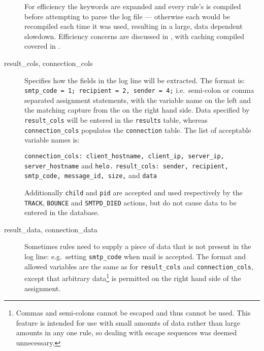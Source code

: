 \begin{description}
        For efficiency the keywords are expanded and every rule's \regex{}
        is compiled before attempting to parse the log file --- otherwise
        each \regex{} would be recompiled each time it was used, resulting
        in a large, data dependent slowdown.  Efficiency concerns are
        discussed in , with caching compiled
        \regexes{} covered in .

    \item [result\_cols, connection\_cols] Specifies how the fields in the
        log line will be extracted.  The format is: \newline \tab{}
        \texttt{smtp\_code = 1; recipient = 2, sender = 4;} \newline i.e.\
        semi-colon or comma separated assignment statements, with the
        variable name on the left and the matching capture from the
        \regex{} on the right hand side.  Data specified by
        \texttt{result\_cols} will be entered in the \texttt{results}
        table, whereas \texttt{connection\_cols} populates the
        \texttt{connection} table.  The list of acceptable variable names
        is:

        \texttt{connection\_cols: client\_hostname, client\_ip, server\_ip,
        \newline \tab{} server\_hostname} and \texttt{helo.\newline}
        \texttt{result\_cols: sender, recipient, smtp\_code, message\_id,
        \newline \tab{} size,} and \texttt{data}

        Additionally \texttt{child} and \texttt{pid} are accepted and used
        respectively by the \texttt{TRACK}, \texttt{BOUNCE} and
        \texttt{SMTPD\_DIED} actions, but do not cause data to be entered
        in the database.

    \item [result\_data, connection\_data] Sometimes rules need to supply a
        piece of data that is not present in the log line: e.g.\ setting
        \texttt{smtp\_code} when mail is accepted.  The format and allowed
        variables are the same as for \texttt{result\_cols} and
        \texttt{connection\_cols}, except that arbitrary
        data\footnote{Commas and semi-colons cannot be escaped and thus
        cannot be used.  This feature is intended for use with small
        amounts of data rather than large amounts in any one rule, so
        dealing with escape sequences was deemed unnecessary.} is permitted
        on the right hand side of the assignment.


\end{description}

